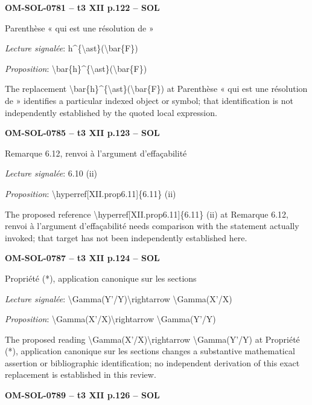 \par\noindent\textbf{OM-SOL-0781 -- t3 XII p.122 -- SOL}\par
Parenthèse « qui est une résolution de »\par
\emph{Lecture signalée}: h\textasciicircum{}\{\textbackslash{}ast\}(\textbackslash{}bar\{F\})\par
\emph{Proposition}: \textbackslash{}bar\{h\}\textasciicircum{}\{\textbackslash{}ast\}(\textbackslash{}bar\{F\})\par
The replacement \textbackslash{}bar\{h\}\textasciicircum{}\{\textbackslash{}ast\}(\textbackslash{}bar\{F\}) at Parenthèse « qui est une résolution de » identifies a particular indexed object or symbol; that identification is not independently established by the quoted local expression.\par
\par\noindent\textbf{OM-SOL-0785 -- t3 XII p.123 -- SOL}\par
Remarque 6.12, renvoi à l'argument d'effaçabilité\par
\emph{Lecture signalée}: 6.10 (ii)\par
\emph{Proposition}: \textbackslash{}hyperref[XII.prop6.11]\{6.11\} (ii)\par
The proposed reference \textbackslash{}hyperref[XII.prop6.11]\{6.11\} (ii) at Remarque 6.12, renvoi à l'argument d'effaçabilité needs comparison with the statement actually invoked; that target has not been independently established here.\par
\par\noindent\textbf{OM-SOL-0787 -- t3 XII p.124 -- SOL}\par
Propriété (*), application canonique sur les sections\par
\emph{Lecture signalée}: \textbackslash{}Gamma(Y'/Y)\textbackslash{}rightarrow \textbackslash{}Gamma(X'/X)\par
\emph{Proposition}: \textbackslash{}Gamma(X'/X)\textbackslash{}rightarrow \textbackslash{}Gamma(Y'/Y)\par
The proposed reading \textbackslash{}Gamma(X'/X)\textbackslash{}rightarrow \textbackslash{}Gamma(Y'/Y) at Propriété (*), application canonique sur les sections changes a substantive mathematical assertion or bibliographic identification; no independent derivation of this exact replacement is established in this review.\par
\par\noindent\textbf{OM-SOL-0789 -- t3 XII p.126 -- SOL}\par
